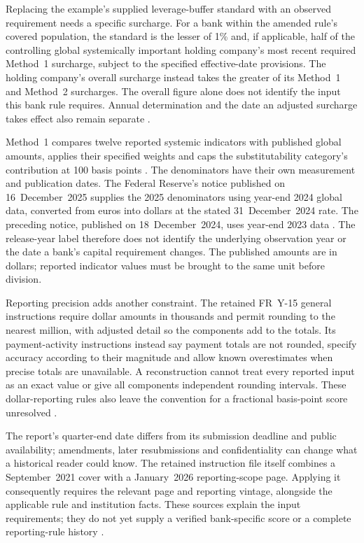Replacing the example's supplied leverage-buffer standard with an observed
requirement needs a specific surcharge. For a bank within the amended rule's
covered population, the standard is the lesser of 1\% and, if applicable,
half of the controlling global systemically important holding company's most
recent required Method~1 surcharge, subject to the specified effective-date
provisions. The holding company's overall surcharge instead takes the greater
of its Method~1 and Method~2 surcharges. The overall figure alone does not
identify the input this bank rule requires.
Annual determination and the date an adjusted surcharge takes effect also
remain separate
\citep[12~CFR~3.11(a)(1)(v)]{occcapitalpayout2026}
\citep[12~CFR~217.403(a)--(d)]{fedgsibsurcharge2026}.

Method~1 compares twelve reported systemic indicators with published global
amounts, applies their specified weights and caps the substitutability
category's contribution at 100 basis points
\citep[12~CFR~217.404]{fedgsibscore2026}.
The denominators have their own measurement and publication dates. The
Federal Reserve's notice published on 16~December~2025 supplies the 2025
denominators using year-end 2024 global data, converted from euros into
dollars at the stated 31~December~2024 rate. The preceding notice, published
on 18~December~2024, uses year-end 2023 data
\citep[pp.~58245--58246]{fedgsibdenominators2025}
\citep[pp.~102908--102909]{fedgsibdenominators2024}.
The release-year label therefore does not identify the underlying observation
year or the date a bank's capital requirement changes. The published amounts
are in dollars; reported indicator values must be brought to the same unit
before division.

Reporting precision adds another constraint. The retained FR~Y-15 general
instructions require dollar amounts in thousands and permit rounding to the
nearest million, with adjusted detail so the components add to the totals.
Its payment-activity instructions instead say payment totals are not rounded,
specify accuracy according to their magnitude and allow known overestimates
when precise totals are unavailable. A reconstruction cannot treat every
reported input as an exact value or give all components independent rounding
intervals. These dollar-reporting rules also leave the convention for a
fractional basis-point score unresolved
\citep[GEN-3--4 and C-1; physical pp.~7--8, 25]{fry15instructionsretained2026}.

\begin{samepage}
The report's quarter-end date differs from its submission deadline and public
availability; amendments, later resubmissions and confidentiality can change
what a historical reader could know. The retained instruction file itself
combines a September~2021 cover with a January~2026 reporting-scope page.
Applying it consequently requires the relevant page and reporting vintage,
alongside the applicable rule and institution facts. These sources explain
the input requirements; they do not yet supply a verified bank-specific score
or a complete reporting-rule history
\citep[cover and GEN-1--5; physical pp.~1, 5--9]{fry15instructionsretained2026}.
\par
\end{samepage}

